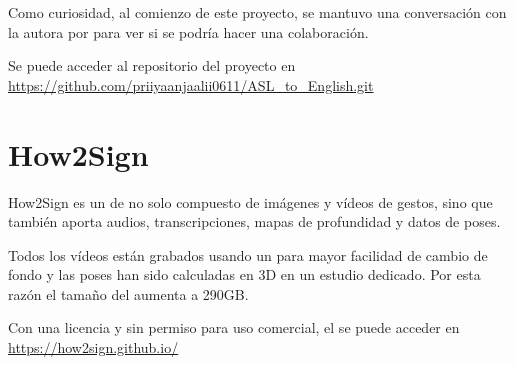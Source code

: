 Como curiosidad, al comienzo de este proyecto, se mantuvo una conversación con la autora por  para ver si se podría hacer una colaboración.

Se puede acceder al repositorio del proyecto en \url{https://github.com/priiyaanjaalii0611/ASL_to_English.git}


\section{How2Sign}

How2Sign  es un  de  no solo compuesto de imágenes y vídeos de gestos, sino que también aporta audios, transcripciones, mapas de profundidad y datos de poses.

Todos los vídeos están grabados usando un  para mayor facilidad de cambio de fondo y las poses han sido calculadas en 3D en un estudio dedicado. Por esta razón el tamaño del  aumenta a 290GB.

Con una licencia  y sin permiso para uso comercial, el  se puede acceder en \url{https://how2sign.github.io/}